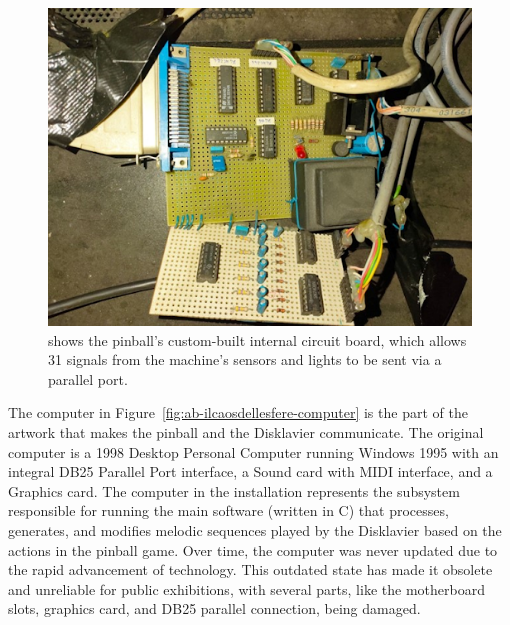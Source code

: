 \begin{figure}[!h]
    \centering
    \includegraphics[width=\linewidth]{chapters/appendix/b/image/figb-ilcaosdellesfere-pcb.jpg}
    \caption{shows the pinball’s custom-built internal circuit board, which allows 31 signals from the machine’s sensors and lights to be sent via a parallel port.}
    \label{fig:ab-ilcaosdellesfere-pcb}
\end{figure}
The computer in Figure~\ref{fig:ab-ilcaosdellesfere-computer} is the part of the artwork that makes the pinball and the Disklavier communicate. The original computer is a 1998 Desktop Personal Computer running Windows 1995 with an integral DB25 Parallel Port interface, a Sound card with MIDI interface, and a Graphics card. The computer in the installation represents the subsystem responsible for running the main software (written in C) that processes, generates, and modifies melodic sequences played by the Disklavier based on the actions in the pinball game. Over time, the computer was never updated due to the rapid advancement of technology. This outdated state has made it obsolete and unreliable for public exhibitions, with several parts, like the motherboard slots, graphics card, and DB25 parallel connection, being damaged.
